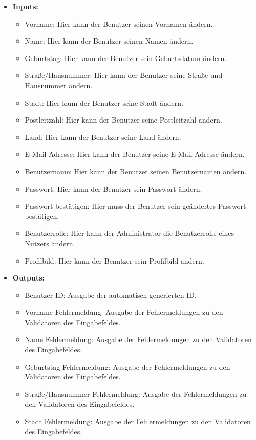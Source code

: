 \begin{itemize}
\begin{itemize}
							\end{itemize}
						\item \textbf{Inputs:}
							\begin{itemize}
								\item Vorname: Hier kann der Benutzer seinen Vornamen ändern.
								\item Name: Hier kann der Benutzer seinen Namen ändern.
								\item Geburtstag: Hier kann der Benutzer sein Geburtsdatum ändern.
								\item Straße/Hausnummer: Hier kann der Benutzer seine Straße und Hausnummer ändern.
								\item Stadt: Hier kann der Benutzer seine Stadt ändern.
								\item Postleitzahl: Hier kann der Benutzer seine Postleitzahl ändern.
								\item Land: Hier kann der Benutzer seine Land ändern.
								\item E-Mail-Adresse: Hier kann der Benutzer seine E-Mail-Adresse ändern.
								\item Benutzername: Hier kann der Benutzer seinen Benutzernamen ändern.
								\item Passwort: Hier kann der Benutzer sein Passwort ändern.
								\item Passwort bestätigen: Hier muss der Benutzer sein geändertes Passwort bestätigen.
								\item Benutzerrolle: Hier kann der Administrator die Benutzerrolle eines Nutzers ändern.
								\item Profilbild: Hier kann der Benutzer sein Profilbild ändern.
							\end{itemize}
						\item \textbf{Outputs:}
							\begin{itemize}
								\item Benutzer-ID: Ausgabe der automatisch generierten ID.
								\item Vorname Fehlermeldung: Ausgabe der Fehlermeldungen zu den Validatoren des Eingabefeldes.
								\item Name Fehlermeldung: Ausgabe der Fehlermeldungen zu den Validatoren des Eingabefeldes.
								\item Geburtstag Fehlermeldung: Ausgabe der Fehlermeldungen zu den Validatoren des Eingabefeldes.
								\item Straße/Hausnummer Fehlermeldung: Ausgabe der Fehlermeldungen zu den Validatoren des Eingabefeldes.
								\item Stadt Fehlermeldung: Ausgabe der Fehlermeldungen zu den Validatoren des Eingabefeldes.

\end{itemize}
\end{itemize}

